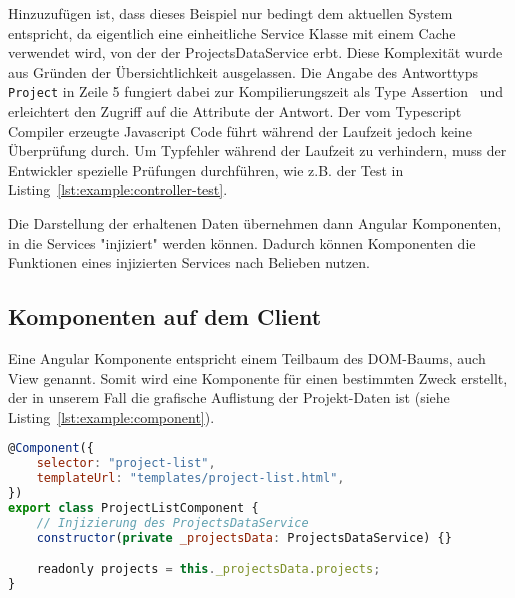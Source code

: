 Hinzuzufügen ist, dass dieses Beispiel nur bedingt dem aktuellen System entspricht, da eigentlich eine einheitliche Service Klasse mit einem Cache verwendet wird, von der der ProjectsDataService erbt. Diese Komplexität wurde aus Gründen der Übersichtlichkeit ausgelassen.
Die Angabe des Antworttyps \texttt{Project} in Zeile 5 fungiert dabei zur Kompilierungszeit als Type Assertion~\cite{typescript-typeassertion}
und erleichtert den Zugriff auf die Attribute der Antwort. Der vom Typescript Compiler erzeugte Javascript Code führt während der Laufzeit jedoch keine Überprüfung durch.
Um Typfehler während der Laufzeit zu verhindern, muss der Entwickler spezielle Prüfungen durchführen, wie z.B. der Test in Listing~\ref{lst:example:controller-test}.

Die Darstellung der erhaltenen Daten übernehmen dann Angular Komponenten, in die Services "injiziert" werden können.
Dadurch können Komponenten die Funktionen eines injizierten Services nach Belieben nutzen.

\subsection{Komponenten auf dem Client}
\label{sec:requirements:example:component}

Eine Angular Komponente entspricht einem Teilbaum des DOM-Baums, auch View genannt.
Somit wird eine Komponente für einen bestimmten Zweck erstellt,
der in unserem Fall die grafische Auflistung der Projekt-Daten ist (siehe Listing~\ref{lst:example:component}).

\begin{lstlisting}[language=JavaScript,float=h!,caption={Funktion zum Abruf aller Projekte vom Server}, label={lst:example:component}]
@Component({
    selector: "project-list",
    templateUrl: "templates/project-list.html",
})
export class ProjectListComponent {
    // Injizierung des ProjectsDataService
    constructor(private _projectsData: ProjectsDataService) {}

    readonly projects = this._projectsData.projects;
}
\end{lstlisting}

